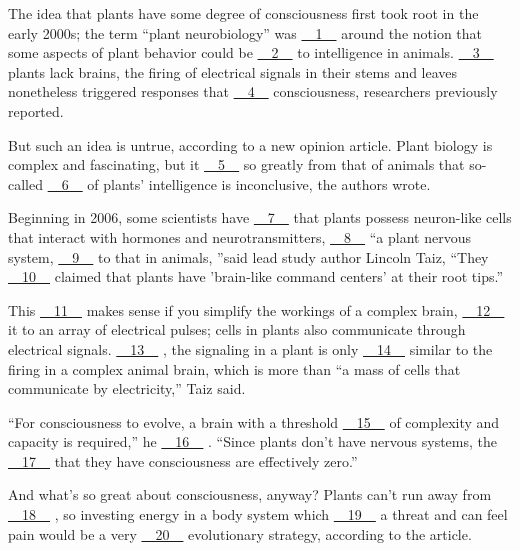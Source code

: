 The idea that plants have some degree of consciousness first took root in the early 2000s; the term ``plant neurobiology'' was \uline{~~1~~} around the notion that some aspects of plant behavior could be \uline{~~2~~} to intelligence in animals. \uline{~~3~~} plants lack brains, the firing of electrical signals in their stems and leaves nonetheless triggered responses that \uline{~~4~~} consciousness, researchers previously reported.


But such an idea is untrue, according to a new opinion article. Plant biology is complex and fascinating, but it \uline{~~5~~} so greatly from that of animals that so-called \uline{~~6~~} of plants' intelligence is inconclusive, the authors wrote.


Beginning in 2006, some scientists have \uline{~~7~~} that plants possess neuron-like cells that interact with hormones and neurotransmitters, \uline{~~8~~} ``a plant nervous system, \uline{~~9~~} to that in animals, ''said lead study author Lincoln Taiz, ``They \uline{~~10~~} claimed that plants have 'brain-like command centers' at their root tips.''


This \uline{~~11~~} makes sense if you simplify the workings of a complex brain, \uline{~~12~~} it to an array of electrical pulses; cells in plants also communicate through electrical signals. \uline{~~13~~} , the signaling in a plant is only \uline{~~14~~} similar to the firing in a complex animal brain, which is more than ``a mass of cells that communicate by electricity,'' Taiz said.


``For consciousness to evolve, a brain with a threshold \uline{~~15~~} of complexity and capacity is required,'' he \uline{~~16~~} . ``Since plants don't have nervous systems, the \uline{~~17~~} that they have consciousness are effectively zero.''


And what's so great about consciousness, anyway? Plants can't run away from \uline{~~18~~} , so investing energy in a body system which \uline{~~19~~} a threat and can feel pain would be a very \uline{~~20~~} evolutionary strategy, according to the article.